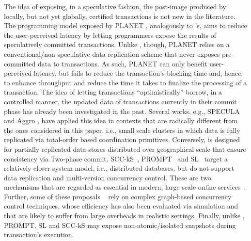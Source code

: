 The idea of exposing, in a speculative fashion, the post-image produced by locally, but not yet globally, certified transactions is not new in the literature. The programming model exposed by PLANET \cite{pang2014planet}, analogously to \specula's,  aims to reduce the user-perceived latency by letting programmers expose the results of speculatively committed transactions. Unlike \specula, though, PLANET relies on a conventional/non-speculative data replication scheme that  never exposes pre-committed data to transactions. As such, PLANET can only benefit user-perceived latency, but fails to reduce the transaction's blocking time and, hence, to enhance throughput and reduce the time it takes to finalize the processing of a transaction. 
The idea of letting transactions ``optimistically'' borrow, in a controlled manner, the updated data of transactions currently in their commit phase has already been investigated in the past. Several works, e.g., SPECULA \cite{peluso2012specula} and Aggro \cite{palmieri2010aggro}, have applied this idea in contexts that are radically different from the ones considered in this paper, i.e.,  small scale clusters in which  data is fully replicated via total-order based coordination primitives. Conversely, \specula is designed for partially replicated data-stores distributed over geographical scale that ensure consistency via Two-phase commit.  SCC-kS~\cite{bestavros1996value}, PROMPT~\cite{PROMPT} and SL~\cite{Reddy} target a relatively closer system model, i.e., distributed databases, but do not support data replication and multi-version concurrency control. These are two mechanisms that are regarded as essential in modern, large scale online services~\cite{spanner,megastore,score}. Further, some of these proposals ~\cite{bestavros1996value, Romano-2014} rely on complex graph-based concurrency control techniques, whose efficiency has also been evaluated via simulation and that are likely to suffer from large overheads in realistic settings. Finally, unlike \specula, PROMPT, SL and SCC-kS may expose non-atomic/isolated snapshots during transaction's execution.